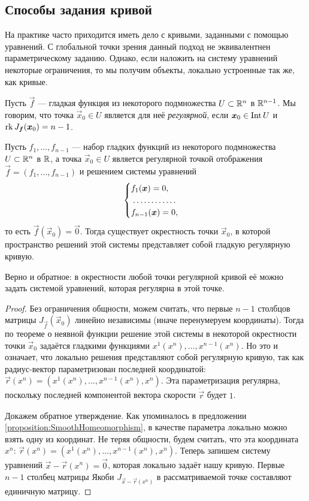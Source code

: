 \subsection{Способы задания кривой}

На практике часто приходится иметь дело с кривыми, заданными с помощью уравнений. С глобальной точки зрения данный подход не эквивалентнен параметрическому заданию. Однако, если наложить на систему уравнений некоторые ограничения, то мы получим объекты, локально устроенные так же, как кривые.

\begin{definition}
	Пусть $\vec{f}$ --- гладкая функция из некоторого подмножества $U \subset \mathbb{R}^n$ в $\mathbb{R}^{n - 1}$. Мы говорим, что точка $\vec{x}_0 \in U$ является для неё \textit{регулярной}, если $\boldsymbol{x}_0 \in \operatorname{Int} U$ и $\operatorname{rk} J_{\boldsymbol{f}}(\boldsymbol{x}_0) = n - 1$.
\end{definition}

\begin{theorem} \label{theorem:SurfacesToCurve}
	Пусть $f_1, \ldots, f_{n - 1}$ --- набор гладких функций из некоторого подмножества $U \subset \mathbb{R}^n$ в $\mathbb{R}$, а точка $\vec{x}_0 \in U$ является регулярной точкой отображения $\vec{f} = (f_1, \ldots, f_{n - 1})$ и решением системы уравнений
	\[
		\begin{cases}
			f_1(\vec{x}) = 0,\\
			\dotfill\\
			f_{n - 1}(\vec{x}) = 0,
		\end{cases}
	\]
	то есть $\vec{f}(\vec{x}_0) = \vec{0}$. Тогда существует окрестность точки $\vec{x}_0$, в которой пространство решений этой системы представляет собой гладкую регулярную кривую.
	
	Верно и обратное: в окрестности любой точки регулярной кривой её можно задать системой уравнений, которая регулярна в этой точке.
\end{theorem}

\begin{proof}
	Без ограничения общности, можем считать, что первые $n - 1$ столбцов матрицы $J_{\vec{f}}(\vec{x}_0)$ линейно независимы (иначе перенумеруем координаты). Тогда по теореме о неявной функции решение этой системы в некоторой окрестности точки $\vec{x}_0$ задаётся гладкими функциями $x^1(x^n), \ldots, x^{n - 1}(x^n)$. Но это и означает, что локально решения представляют собой регулярную кривую, так как радиус-вектор параметризован последней координатой: $\vec{r}(x^n) = (x^1(x^n), \ldots, x^{n - 1}(x^n), x^n)$. Эта параметризация регулярна, поскольку последней компонентой вектора скорости $\dot{\vec{r}}$ будет $1$.

	Докажем обратное утверждение. Как упоминалось в предложении \ref{proposition:SmoothHomeomorphism}, в качестве параметра локально можно взять одну из координат. Не теряя общности, будем считать, что эта координата $x^n$: $\vec{r}(x^n) = (x^1(x^n), \ldots, x^{n - 1}(x^n), x^n)$. Теперь запишем систему уравнений $\vec{x} - \vec{r}(x^n) = \vec{0}$, которая локально задаёт нашу кривую. Первые $n - 1$ столбец матрицы Якоби $J_{\vec{x} - \vec{r}(x^n)}$ в рассматриваемой точке составляют единичную матрицу.
\end{proof}

